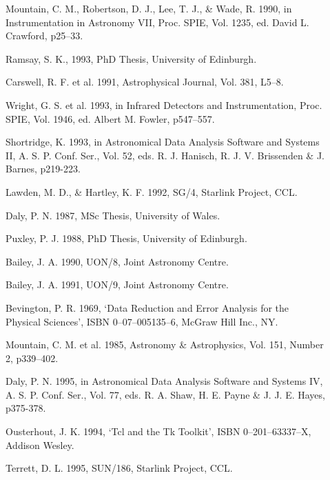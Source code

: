 \documentclass[a4paper]{book}
\renewcommand{\_}{{\tt\char'137}}
\begin{document}
\begin{description}
\item[] Mountain, C. M., Robertson, D. J., Lee, T. J., \& Wade, R. 1990,
      in Instrumentation in Astronomy VII, Proc. SPIE, Vol. 1235, ed. David L. Crawford, p25--33.
\item[] Ramsay, S. K., 1993, PhD Thesis, University of Edinburgh.
\item[] Carswell, R. F. et al. 1991, Astrophysical Journal, Vol. 381, L5--8.
\item[] Wright, G. S. et al. 1993, in Infrared Detectors and Instrumentation, Proc. SPIE,
      Vol. 1946, ed. Albert M. Fowler, p547--557.
\item[] Shortridge, K. 1993, in  Astronomical Data Analysis Software
      and Systems II, A. S. P. Conf. Ser., Vol. 52, eds. R. J. Hanisch, 
      R. J. V. Brissenden \& J. Barnes, p219-223.
\item[] Lawden, M. D., \& Hartley, K. F. 1992, SG/4, Starlink Project, CCL.
\item[] Daly, P. N. 1987, MSc Thesis, University of Wales.
\item[] Puxley, P. J. 1988, PhD Thesis, University of Edinburgh.
\item[] Bailey, J. A. 1990, UON/8, Joint Astronomy Centre.
\item[] Bailey, J. A. 1991, UON/9, Joint Astronomy Centre.
\item[] Bevington, P. R. 1969, `Data Reduction and Error Analysis for the Physical Sciences',
      ISBN 0--07--005135--6, McGraw Hill Inc., NY.
\item[] Mountain, C. M. et al. 1985, Astronomy \& Astrophysics, Vol. 151, Number 2, p339--402.
\item[] Daly, P. N. 1995, in Astronomical Data Analysis Software and Systems IV, 
      A. S. P. Conf. Ser., Vol. 77, eds. R. A. Shaw, H. E. Payne \& J. J. E. Hayes, p375-378.
\item[] Ousterhout, J. K. 1994, `Tcl and the Tk Toolkit', ISBN 0--201--63337--X, Addison Wesley.
\item[] Terrett, D. L. 1995, SUN/186, Starlink Project, CCL.
\end{description}
\end{document}
